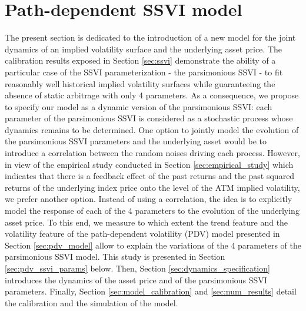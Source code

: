 \section{Path-dependent SSVI model}\label{sec:pdv_ssvi}
The present section is dedicated to the introduction of a new model for the joint dynamics of an implied volatility surface and the underlying asset price. The calibration results exposed in Section \ref{sec:ssvi} demonstrate the ability of a particular case of the SSVI parameterization - the parsimonious SSVI - to fit reasonably well historical implied volatility surfaces while guaranteeing the absence of static arbitrage with only 4 parameters. As a consequence, we propose to specify our model as a dynamic version of the parsimonious SSVI: each parameter of the parsimonious SSVI is considered as a stochastic process whose dynamics remains to be determined. One option to jointly model the evolution of the parsimonious SSVI parameters and the underlying asset would be to introduce a correlation between the random noises driving each process. However, in view of the empirical study conducted in Section \ref{sec:empirical_study} which indicates that there is a feedback effect of the past returns and the past squared returns of the underlying index price onto the level of the ATM implied volatility, we prefer another option. Instead of using a correlation, the idea is to explicitly model the response of each of the 4 parameters to the evolution of the underlying asset price. To this end, we measure to which extent the trend feature and the volatility feature of the path-dependent volatility (PDV) model presented in Section \ref{sec:pdv_model} allow to explain the variations of the 4 parameters of the parsimonious SSVI model. This study is presented in Section \ref{sec:pdv_ssvi_params} below. Then, Section \ref{sec:dynamics_specification} introduces the dynamics of the asset price and of the parsimonious SSVI parameters. Finally, Section \ref{sec:model_calibration} and \ref{sec:num_results} detail the calibration and the simulation of the model. \\


